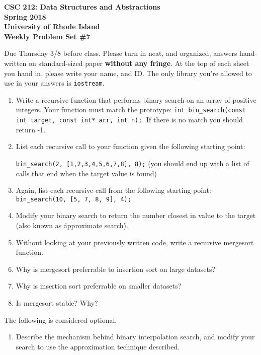 \documentclass[11pt]{article}
\begin{document}
\thispagestyle{empty}

\begin{center}
    {\Large\bf CSC 212: Data Structures and Abstractions}\\
    \medskip
    {\Large\bf Spring 2018}\\
    \medskip
    {\Large\bf University of Rhode Island}\\
    \bigskip
    {\Large\bf Weekly Problem Set \#7}
\end{center}

Due Thursday 3/8 before class. Please turn in neat, and organized, answers hand-written on standard-sized paper \textbf{without any fringe}. At the top of each sheet you hand in, please write your name, and ID.
The only library you're allowed to use in your answers is \verb|iostream|.

\begin{enumerate}
    \item Write a recursive function that performs binary search on an array of positive integers. Your function must match the prototype: \verb|int bin_search(const int target, const int* arr, int n);|. If there is no match you should return -1.

    \item List each recursive call to your function given the following starting point: 
    
    \verb|bin_search(2, [1,2,3,4,5,6,7,8], 8);| (you should end up with a list of calls that end when the target value is found)

    \item Again, list each recursive call from the following starting point: 
    \verb|bin_search(10, [5, 7, 8, 9], 4);|

    \item Modify your binary search to return the number closest in value to the target (also known as \'approximate search\'). 

    \item Without looking at your previously written code, write a recursive mergesort function.

    \item Why is mergesort preferrable to insertion sort on large datasets?

    \item Why is insertion sort preferrable on smaller datasets?

    \item Is mergesort stable? Why?

\end{enumerate}

The following is considered optional.

\begin{enumerate}
    \item Describe the mechanism behind binary interpolation search, and modify your search to use the approximation technique described.
\end{enumerate}

\label{r:lastpage}
\end{document}
